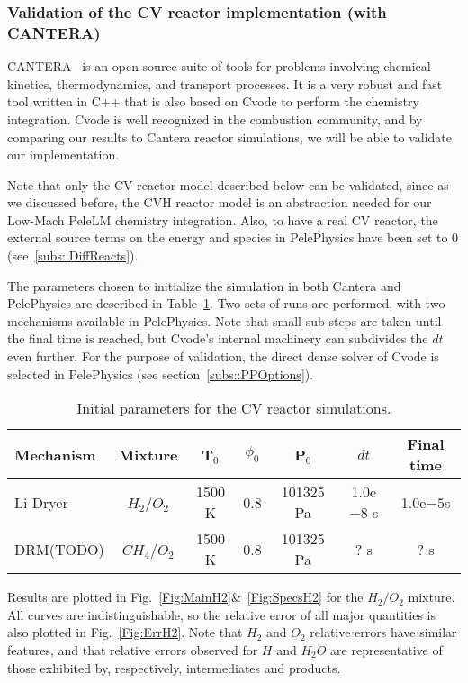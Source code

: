 \documentclass[12pt]{article}
\begin{document}
\subsubsection{Validation of the CV reactor implementation (with CANTERA)}
\label{subsub::ValidCVreact}

CANTERA~\cite{cantera} is an open-source suite of tools for problems involving chemical kinetics, thermodynamics, and transport processes. It is a very robust and fast tool written in C++ that is also based on Cvode to perform the chemistry integration. Cvode is well recognized in the combustion community, and by comparing our results to Cantera reactor simulations, we will be able to validate our implementation. 

Note that only the CV reactor model described below can be validated, since as we discussed before, the CVH reactor model is an abstraction needed for our Low-Mach PeleLM chemistry integration. Also, to have a real CV reactor, the external source terms on the energy and species in PelePhysics have been set to 0 (see~\ref{subs::DiffReacts}).

The parameters chosen to initialize the simulation in both Cantera and PelePhysics are described in Table~\ref{table:parameters}. Two sets of runs are performed, with two mechanisms available in PelePhysics. Note that small sub-steps are taken until the final time is reached, but Cvode's internal machinery can subdivides the $dt$ even further. For the purpose of validation, the direct dense solver of Cvode is selected in PelePhysics (see section~\ref{subs::PPOptions}).
\begin{table}
\centering
\begin{tabular}{l c c c c c c}
\hline 
Mechanism          & Mixture                 & T$_0$   & $\phi_0$ & P$_0$          & $dt$              & Final time \\
\hline \hline
Li Dryer               & {$H_2$/$O_2$}    & 1500 K  & 0.8         & 101325 Pa   & 1.0e$-8$ s    & 1.0e$-5$s \\
DRM(TODO)                   & {$CH_4$/$O_2$}  & 1500 K  & 0.8         &  101325 Pa  & ? s &  ? s \\
\end{tabular}
\caption{Initial parameters for the CV reactor simulations.}
\label{table:parameters}
\end{table}

Results are plotted in Fig.~\ref{Fig:MainH2}\&~\ref{Fig:SpecsH2} for the $H_2/O_2$ mixture. All curves are indistinguishable, so the relative error of all major quantities is also plotted in Fig.~\ref{Fig:ErrH2}. Note that $H_2$ and $O_2$ relative errors have similar features, and that relative errors observed for $H$ and $H_2O$ are representative of those exhibited by, respectively, intermediates and products.
\end{document}

